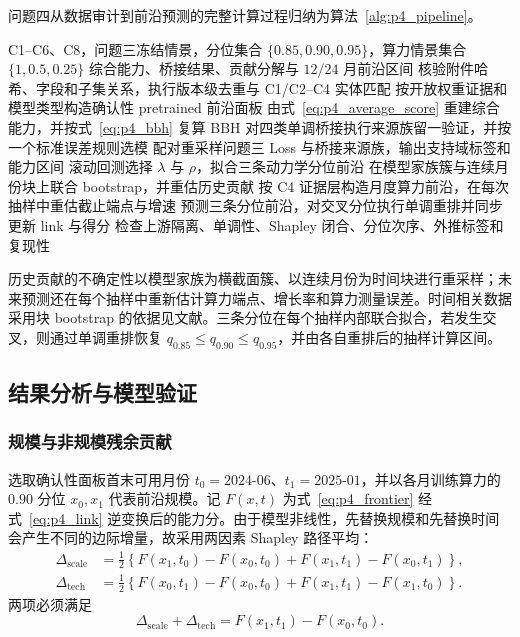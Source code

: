问题四从数据审计到前沿预测的完整计算过程归纳为算法~\ref{alg:p4_pipeline}。

\begin{algorithm}[H]
\caption{分层证据融合与动力学能力前沿预测}
\label{alg:p4_pipeline}
\begin{algorithmic}[1]
\Require C1--C6、C8，问题三冻结情景，分位集合 $\{0.85,0.90,0.95\}$，算力情景集合 $\{1,0.5,0.25\}$
\Ensure 综合能力、桥接结果、贡献分解与 $12/24$ 月前沿区间
\State 核验附件哈希、字段和子集关系，执行版本级去重与 C1/C2--C4 实体匹配
\State 按开放权重证据和模型类型构造确认性 pretrained 前沿面板
\State 由式~\eqref{eq:p4_average_score} 重建综合能力，并按式~\eqref{eq:p4_bbh} 复算 BBH
    \State 对四类单调桥接执行来源族留一验证，并按一个标准误差规则选模
    \State 配对重采样问题三 Loss 与桥接来源族，输出支持域标签和能力区间
\EndFor
\State 滚动回测选择 $\lambda$ 与 $\rho$，拟合三条动力学分位前沿
\State 在模型家族簇与连续月份块上联合 bootstrap，并重估历史贡献
\State 按 C4 证据层构造月度算力前沿，在每次抽样中重估截止端点与增速
    \State 预测三条分位前沿，对交叉分位执行单调重排并同步更新 link 与得分
\EndFor
\State 检查上游隔离、单调性、Shapley 闭合、分位次序、外推标签和复现性
\end{algorithmic}
\end{algorithm}

历史贡献的不确定性以模型家族为横截面簇、以连续月份为时间块进行重采样；未来预测还在每个抽样中重新估计算力端点、增长率和算力测量误差。时间相关数据采用块 bootstrap 的依据见文献\cite{kunsch1989bootstrap}。三条分位在每个抽样内部联合拟合，若发生交叉，则通过单调重排恢复 $q_{0.85}\le q_{0.90}\le q_{0.95}$\cite{chernozhukov2010quantile}，并由各自重排后的抽样计算区间。

\subsection{结果分析与模型验证}

\subsubsection{规模与非规模残余贡献}

选取确认性面板首末可用月份 $t_0=\text{2024-06}$、$t_1=\text{2025-01}$，并以各月训练算力的 $0.90$ 分位 $x_0,x_1$ 代表前沿规模。记 $F(x,t)$ 为式~\eqref{eq:p4_frontier} 经式~\eqref{eq:p4_link} 逆变换后的能力分。由于模型非线性，先替换规模和先替换时间会产生不同的边际增量，故采用两因素 Shapley 路径平均\cite{shapley1953value}：
\begin{align}
\Delta_{\mathrm{scale}}
&=\frac12\left\{F(x_1,t_0)-F(x_0,t_0)
+F(x_1,t_1)-F(x_0,t_1)\right\},\label{eq:p4_scale_contribution}\\
\Delta_{\mathrm{tech}}
&=\frac12\left\{F(x_0,t_1)-F(x_0,t_0)
+F(x_1,t_1)-F(x_1,t_0)\right\}.\label{eq:p4_tech_contribution}
\end{align}
两项必须满足
\begin{equation}
\Delta_{\mathrm{scale}}+\Delta_{\mathrm{tech}}
=F(x_1,t_1)-F(x_0,t_0).
\label{eq:p4_shapley_closure}
\end{equation}

